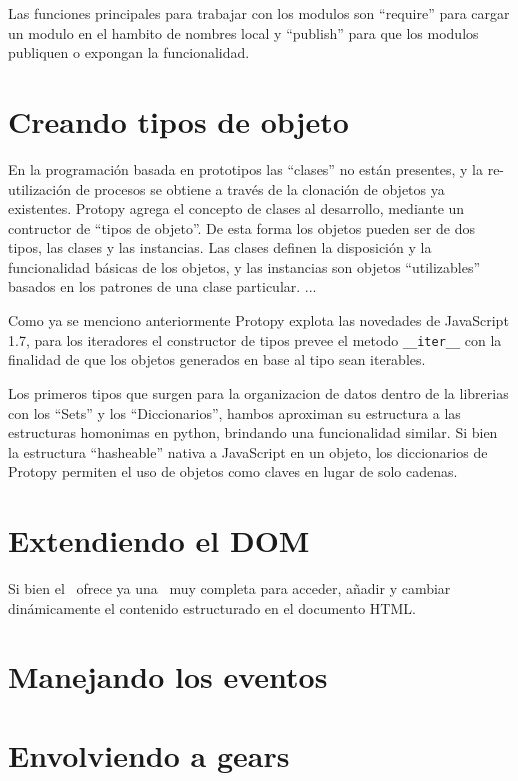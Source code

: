 Las funciones principales para trabajar con los modulos son ``require'' para
cargar un modulo en el hambito de nombres local y ``publish'' para que los
modulos publiquen o expongan la funcionalidad.

\section{Creando tipos de objeto}
En la programación basada en prototipos las ``clases'' no están presentes, y la
re-utilización de procesos se obtiene a través de la clonación de objetos ya
existentes.
Protopy agrega el concepto de clases al desarrollo, mediante un contructor de
``tipos de objeto''. De esta forma los objetos pueden ser de dos tipos, las
clases y las instancias. Las clases definen la disposición y la funcionalidad
básicas de los objetos, y las instancias son objetos ``utilizables'' basados en
los patrones de una clase particular.
...

Como ya se menciono anteriormente Protopy explota las novedades de JavaScript
1.7, para los iteradores el constructor de tipos prevee el metodo
\verb|__iter__| con la finalidad de que los objetos generados en base al tipo
sean iterables.

Los primeros tipos que surgen para la organizacion de datos dentro de la
librerias con los ``Sets'' y los ``Diccionarios'', hambos aproximan su
estructura a las estructuras homonimas en python, brindando una funcionalidad
similar. Si bien la estructura ``hasheable'' nativa a JavaScript en un objeto,
los diccionarios de Protopy permiten el uso de objetos como claves en lugar de
solo cadenas.

\section{Extendiendo el DOM}
Si bien el \DOM\ ofrece ya una \API\ muy completa para acceder, añadir y cambiar
dinámicamente el contenido estructurado en el documento HTML.

\section{Manejando los eventos}

\section{Envolviendo a gears}
